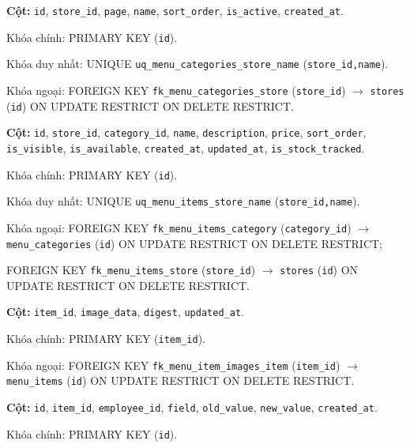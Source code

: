 \begin{description}[leftmargin=3.6cm,labelwidth=3.4cm,style=nextline]

\item[\texttt{menu\_categories}] \textbf{Cột:} \texttt{id}, \texttt{store\_id}, \texttt{page}, \texttt{name}, \texttt{sort\_order}, \texttt{is\_active}, \texttt{created\_at}.

Khóa chính: PRIMARY KEY (\texttt{id}).

Khóa duy nhất: UNIQUE \texttt{uq\_menu\_categories\_store\_name} (\texttt{store\_id,name}).

Khóa ngoại: FOREIGN KEY \texttt{fk\_menu\_categories\_store} (\texttt{store\_id}) $\rightarrow$ \texttt{stores} (\texttt{id}) ON UPDATE RESTRICT ON DELETE RESTRICT.

\item[\texttt{menu\_items}] \textbf{Cột:} \texttt{id}, \texttt{store\_id}, \texttt{category\_id}, \texttt{name}, \texttt{description}, \texttt{price}, \texttt{sort\_order}, \texttt{is\_visible}, \texttt{is\_available}, \texttt{created\_at}, \texttt{updated\_at}, \texttt{is\_stock\_tracked}.

Khóa chính: PRIMARY KEY (\texttt{id}).

Khóa duy nhất: UNIQUE \texttt{uq\_menu\_items\_store\_name} (\texttt{store\_id,name}).

Khóa ngoại: FOREIGN KEY \texttt{fk\_menu\_items\_category} (\texttt{category\_id}) $\rightarrow$ \texttt{menu\_categories} (\texttt{id}) ON UPDATE RESTRICT ON DELETE RESTRICT;\par FOREIGN KEY \texttt{fk\_menu\_items\_store} (\texttt{store\_id}) $\rightarrow$ \texttt{stores} (\texttt{id}) ON UPDATE RESTRICT ON DELETE RESTRICT.

\item[\texttt{menu\_item\_images}] \textbf{Cột:} \texttt{item\_id}, \texttt{image\_data}, \texttt{digest}, \texttt{updated\_at}.

Khóa chính: PRIMARY KEY (\texttt{item\_id}).

Khóa ngoại: FOREIGN KEY \texttt{fk\_menu\_item\_images\_item} (\texttt{item\_id}) $\rightarrow$ \texttt{menu\_items} (\texttt{id}) ON UPDATE RESTRICT ON DELETE RESTRICT.

\item[\texttt{menu\_item\_changes}] \textbf{Cột:} \texttt{id}, \texttt{item\_id}, \texttt{employee\_id}, \texttt{field}, \texttt{old\_value}, \texttt{new\_value}, \texttt{created\_at}.

Khóa chính: PRIMARY KEY (\texttt{id}).


\end{description}
